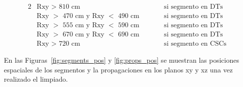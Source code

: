 \begin{alignat*}{2}
& \text{Rxy $>$ 810 cm}                  \quad \quad && \text{si segmento en DTs} \\
& \text{Rxy $>$ 470 cm y Rxy $<$ 490 cm} \quad \quad && \text{si segmento en DTs} \\
& \text{Rxy $>$ 555 cm y Rxy $<$ 590 cm} \quad \quad && \text{si segmento en DTs} \\
& \text{Rxy $>$ 670 cm y Rxy $<$ 690 cm} \quad \quad && \text{si segmento en DTs} \\
& \text{Rxy $>$ 720 cm}                  \quad \quad && \text{si segmento en CSCs}
\end{alignat*}


En las Figuras~\ref{fig:segments_pos} y \ref{fig:props_pos} se muestran las posiciones espaciales de los segmentos y la propagaciones en los planos xy y xz una vez realizado el limpiado. \\


